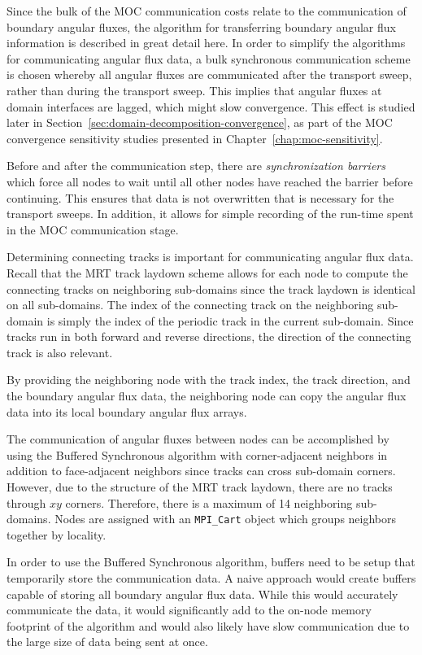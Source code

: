 Since the bulk of the \ac{MOC} communication costs relate to the communication of boundary angular fluxes, the algorithm for transferring boundary angular flux information is described in great detail here. In order to simplify the algorithms for communicating angular flux data, a bulk synchronous communication scheme is chosen whereby all angular fluxes are communicated after the transport sweep, rather than during the transport sweep. This implies that angular fluxes at domain interfaces are lagged, which might slow convergence. This effect is studied later in Section~\ref{sec:domain-decomposition-convergence}, as part of the 
\ac{MOC} convergence sensitivity studies presented in Chapter~\ref{chap:moc-sensitivity}.

Before and after the communication step, there are \textit{synchronization barriers} which force all nodes to wait until all other nodes have reached the barrier before continuing. This ensures that data is not overwritten that is necessary for the transport sweeps. In addition, it allows for simple recording of the run-time spent in the \ac{MOC} communication stage.

Determining connecting tracks is important for communicating angular flux data. Recall that the \ac{MRT} track laydown scheme allows for each node to compute the connecting tracks on neighboring sub-domains since the track laydown is identical on all sub-domains. The index of the connecting track on the neighboring sub-domain is simply the index of the periodic track in the current sub-domain. Since tracks run in both forward and reverse directions, the direction of the connecting track is also relevant. 

By providing the neighboring node with the track index, the track direction, and the boundary angular flux data, the neighboring node can copy the angular flux data into its local boundary angular flux arrays. 

The communication of angular fluxes between nodes can be accomplished by using the Buffered Synchronous algorithm with corner-adjacent neighbors in addition to face-adjacent neighbors since tracks can cross sub-domain corners. However, due to the structure of the \ac{MRT} track laydown, there are no tracks through $xy$ corners. Therefore, there is a maximum of 14 neighboring sub-domains. Nodes are assigned with an \texttt{MPI_Cart} object which groups neighbors together by locality.

In order to use the Buffered Synchronous algorithm, buffers need to be setup that temporarily store the communication data. A naive approach would create buffers capable of storing all boundary angular flux data. While this would accurately communicate the data, it would significantly add to the on-node memory footprint of the algorithm and would also likely have slow communication due to the large size of data being sent at once.

